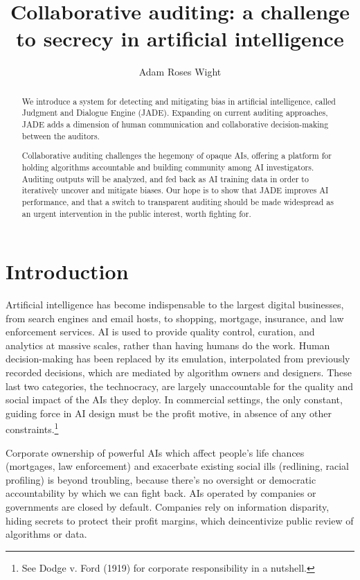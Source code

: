 \documentclass[format=sigconf]{acmart}
\title{Collaborative auditing: a challenge to secrecy in artificial intelligence}
\author{Adam Roses Wight}
\affiliation{Wikimedia Foundation}
\begin{document}
\begin{abstract}
We introduce a system for detecting and mitigating bias in artificial intelligence, called Judgment and Dialogue Engine (JADE).  Expanding on current auditing approaches, JADE adds a dimension of human communication and collaborative decision-making between the auditors.

Collaborative auditing challenges the hegemony of opaque AIs, offering a platform for holding algorithms accountable and building community among AI investigators.  Auditing outputs will be analyzed, and fed back as AI training data in order to iteratively uncover and mitigate biases.  Our hope is to show that JADE improves AI performance, and that a switch to transparent auditing should be made widespread as an urgent intervention in the public interest, worth fighting for.
\end{abstract}

\maketitle

\section{Introduction}

Artificial intelligence has become indispensable to the largest digital businesses, from search engines and email hosts, to shopping, mortgage, insurance, and law enforcement services.  AI is used to provide quality control, curation, and analytics at massive scales, rather than having humans do the work.  Human decision-making has been replaced by its emulation, interpolated from previously recorded decisions, which are mediated by algorithm owners and designers.  These last two categories, the technocracy, are largely unaccountable for the quality and social impact of the AIs they deploy.  In commercial settings, the only constant, guiding force in AI design must be the profit motive, in absence of any other constraints.\footnote{See Dodge v. Ford (1919) for corporate responsibility in a nutshell.}

Corporate ownership of powerful AIs which affect people's life chances (mortgages, law enforcement) and exacerbate existing social ills (redlining, racial profiling) is beyond troubling, because there's no oversight or democratic accountability by which we can fight back.  AIs operated by companies or governments are closed by default.  Companies rely on information disparity, hiding secrets to protect their profit margins, which deincentivize public review of algorithms or data.
\end{document}
